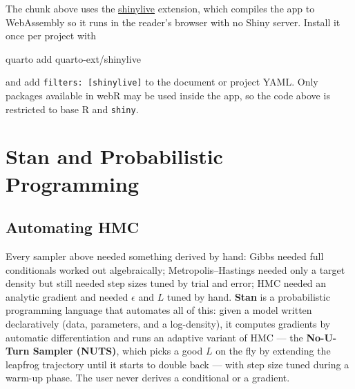 \documentclass[
  letterpaper,
  DIV=11,
  numbers=noendperiod]{scrreprt}
\newenvironment{Shaded}{\begin{snugshade}}{\end{snugshade}}
\newcommand{\ExtensionTok}[1]{\textcolor[rgb]{0.00,0.23,0.31}{#1}}
\newcommand{\NormalTok}[1]{\textcolor[rgb]{0.00,0.23,0.31}{#1}}
\begin{document}
\begin{tcolorbox}[enhanced jigsaw, arc=.35mm, bottomrule=.15mm, bottomtitle=1mm, breakable, colback=white, colbacktitle=quarto-callout-note-color!10!white, colframe=quarto-callout-note-color-frame, coltitle=black, left=2mm, leftrule=.75mm, opacityback=0, opacitybacktitle=0.6, rightrule=.15mm, title=\textcolor{quarto-callout-note-color}{\faInfo}\hspace{0.5em}{Reproducing this figure}, titlerule=0mm, toprule=.15mm, toptitle=1mm]

The chunk above uses the
\href{https://github.com/quarto-ext/shinylive}{shinylive} extension,
which compiles the app to WebAssembly so it runs in the reader's browser
with no Shiny server. Install it once per project with

\begin{Shaded}
\begin{Highlighting}[]
\ExtensionTok{quarto}\NormalTok{ add quarto{-}ext/shinylive}
\end{Highlighting}
\end{Shaded}

and add \texttt{filters:\ {[}shinylive{]}} to the document or project
YAML. Only packages available in webR may be used inside the app, so the
code above is restricted to base R and \texttt{shiny}.

\end{tcolorbox}

\section{Stan and Probabilistic
Programming}\label{stan-and-probabilistic-programming}

\subsection{Automating HMC}\label{automating-hmc}

Every sampler above needed something derived by hand: Gibbs needed full
conditionals worked out algebraically; Metropolis--Hastings needed only
a target density but still needed step sizes tuned by trial and error;
HMC needed an analytic gradient and needed \(\epsilon\) and \(L\) tuned
by hand. \textbf{Stan} is a probabilistic programming language that
automates all of this: given a model written declaratively (data,
parameters, and a log-density), it computes gradients by automatic
differentiation and runs an adaptive variant of HMC --- the
\textbf{No-U-Turn Sampler (NUTS)}, which picks a good \(L\) on the fly
by extending the leapfrog trajectory until it starts to double back ---
with step size tuned during a warm-up phase. The user never derives a
conditional or a gradient.
\end{document}
